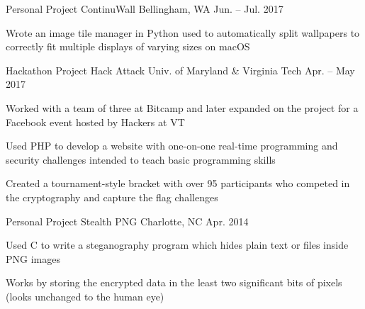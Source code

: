 

\begin{cventries}

  \cventry
    {Personal Project} %
    {ContinuWall} %
    {Bellingham, WA} %
    {Jun. – Jul. 2017} %
    {
      \begin{cvitems} %
      \item {Wrote an image tile manager in Python used to automatically split wallpapers to correctly fit multiple displays of varying sizes on macOS}
      \end{cvitems}
    }

  \cventry
    {Hackathon Project} %
    {Hack Attack} %
    {Univ. of Maryland \& Virginia Tech} %
    {Apr. – May 2017} %
    {
      \begin{cvitems} %
      \item {Worked with a team of three at Bitcamp and later expanded on the project for a Facebook event hosted by Hackers at VT}
      \item {Used PHP to develop a website with one-on-one real-time programming and security challenges intended to teach basic programming skills}
      \item {Created a tournament-style bracket with over 95 participants who competed in the cryptography and capture the flag challenges}
      \end{cvitems}
    }

  \cventry
    {Personal Project} %
    {Stealth PNG} %
    {Charlotte, NC} %
    {Apr. 2014} %
    {
      \begin{cvitems} %
      \item {Used C to write a steganography program which hides plain text or files inside PNG images}
      \item {Works by storing the encrypted data in the least two significant bits of pixels (looks unchanged to the human eye)}
      \end{cvitems}
    }

\end{cventries}

